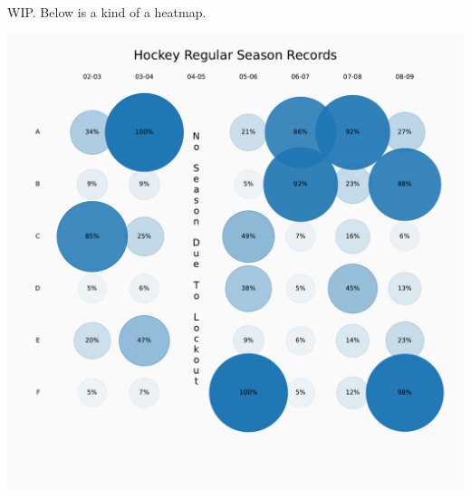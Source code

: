 WIP. Below is a kind of a heatmap. 


\begin{center}
    \includegraphics[width = .7\textwidth]{figures/poetryplots/hockey-heat.pdf}
\end{center}